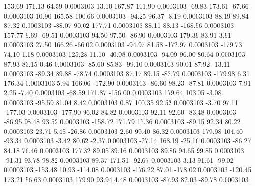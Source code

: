       153.69      171.13       64.59     0.0003103
       13.10      167.87      101.90     0.0003103
      -69.83      173.61      -67.66     0.0003103
       10.90      165.58      100.66     0.0003103
      -94.25       96.37       -8.19     0.0003103
       88.19       89.84       87.32     0.0003103
      -88.07       90.02      177.71     0.0003103
       88.11       88.13     -168.56     0.0003103
      157.77        9.69      -69.51     0.0003103
       94.50       97.50      -86.90     0.0003103
      179.39       83.91        3.91     0.0003103
       27.50      166.26      -66.02     0.0003103
      -94.97       81.58     -172.97     0.0003103
     -179.73       74.10        1.18     0.0003103
      125.28       11.10      -40.08     0.0003103
      -94.09       96.00       80.64     0.0003103
       87.93       83.15        0.46     0.0003103
      -85.60       85.83      -99.10     0.0003103
       90.01       87.92      -13.11     0.0003103
      -89.34       89.88      -78.74     0.0003103
       87.17       89.15      -83.79     0.0003103
     -179.98        6.31      176.34     0.0003103
        5.94      166.06     -172.90     0.0003103
      -86.60       98.23      -87.81     0.0003103
        7.91        2.25       -7.40     0.0003103
      -68.59      171.87     -156.00     0.0003103
      179.64      103.05       -3.08     0.0003103
      -95.59       81.04        8.42     0.0003103
        0.87      100.35       92.52     0.0003103
       -3.70       97.11     -177.03     0.0003103
     -177.90       96.02       84.82     0.0003103
       92.11       92.60      -83.48     0.0003103
      -86.95       98.48       93.52     0.0003103
     -158.72      171.79       17.36     0.0003103
      -89.15       92.34       80.22     0.0003103
       23.71        5.45      -26.86     0.0003103
        2.60       99.40       86.32     0.0003103
      179.98      104.40      -93.34     0.0003103
       -3.42       80.62       -2.37     0.0003103
      -27.14      168.19      -25.16     0.0003103
      -86.27       84.18       76.46     0.0003103
      177.32       89.05       89.16     0.0003103
       89.86       94.65       99.85     0.0003103
      -91.31       93.78       98.82     0.0003103
       89.37      171.51      -92.67     0.0003103
        3.13       91.61      -99.02     0.0003103
     -153.48       10.93     -114.08     0.0003103
     -176.22       87.01     -178.02     0.0003103
     -120.45      173.21       56.63     0.0003103
      179.90       93.94        4.48     0.0003103
      -87.93       82.03      -89.78     0.0003103
